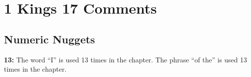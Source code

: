 \section{1 Kings 17 Comments}

\subsection{Numeric Nuggets}
\textbf{13: } The word ``I'' is used 13 times in the chapter. The phrase ``of the'' is used 13 times in the chapter.
